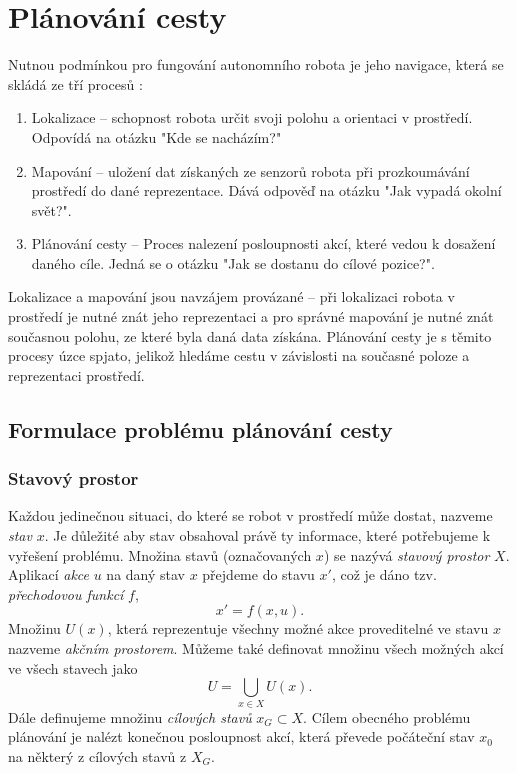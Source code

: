 
\cleardoublepage
\chapter{Plánování cesty}
Nutnou podmínkou pro fungování autonomního robota je jeho navigace, která se skládá ze tří procesů \cite{Meyer2003,Stachniss2009,Koubaa20180406}:
\begin{enumerate}
	\item Lokalizace -- schopnost robota určit svoji polohu a orientaci v prostředí. Odpovídá na otázku "Kde se nacházím?"
	\item Mapování -- uložení dat získaných ze senzorů robota při prozkoumávání prostředí do dané reprezentace. Dává odpověď na otázku "Jak vypadá okolní svět?".
	\item Plánování cesty -- Proces nalezení posloupnosti akcí, které vedou k dosažení daného cíle. Jedná se o otázku "Jak se dostanu do cílové pozice?".
\end{enumerate}
Lokalizace a mapování jsou navzájem provázané -- při lokalizaci robota v prostředí je nutné znát jeho reprezentaci a pro správné mapování je nutné znát současnou polohu, ze které byla daná data získána. Plánování cesty je s těmito procesy úzce spjato, jelikož hledáme cestu v závislosti na současné poloze a reprezentaci prostředí. 

\section{Formulace problému plánování cesty}\label{sec:stateSpace}
\subsection{Stavový prostor}
Každou jedinečnou situaci, do které se robot v prostředí může dostat, nazveme \emph{stav} $x$. Je důležité aby stav obsahoval právě ty informace, které potřebujeme k vyřešení problému. Množina stavů (označovaných $x$) se nazývá \emph{stavový prostor} $X$. Aplikací \emph{akce} $u$ na daný stav $x$ přejdeme do stavu $x'$, což je dáno tzv. \emph{přechodovou funkcí} $f$,
\begin{equation}
x'=f\left(x,u\right).
\end{equation}
Množinu $U(x)$, která reprezentuje všechny možné akce proveditelné ve stavu $x$ nazveme \emph{akčním prostorem}. Můžeme také definovat množinu všech možných akcí ve všech stavech jako
\begin{equation}
U=\bigcup_{x \in X} U(x).
\end{equation}
Dále definujeme množinu \emph{cílových stavů} $x_G \subset X$. Cílem obecného problému plánování je nalézt konečnou posloupnost akcí, která převede počáteční stav $x_0$ na některý z cílových stavů z $X_G$. 

